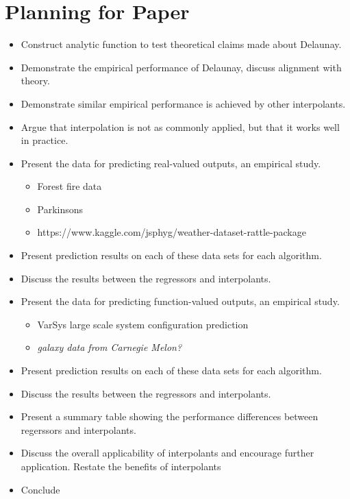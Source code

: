 \documentclass[smallextended]{svjour3}       %
\begin{document}
\section{Planning for Paper}

\begin{itemize}
\item Construct analytic function to test theoretical claims made about Delaunay.
\item Demonstrate the empirical performance of Delaunay, discuss alignment with theory.
\item Demonstrate similar empirical performance is achieved by other interpolants.
\item Argue that interpolation is not as commonly applied, but that it works well in practice.
\item Present the data for predicting real-valued outputs, an empirical study.
  \begin{itemize}
  \item Forest fire data
  \item Parkinsons
  \item https://www.kaggle.com/jsphyg/weather-dataset-rattle-package
  \end{itemize}
\item Present prediction results on each of these data sets for each algorithm.
\item Discuss the results between the regressors and interpolants.
\item Present the data for predicting function-valued outputs, an empirical study.
  \begin{itemize}
  \item VarSys large scale system configuration prediction
  \item \textit{galaxy data from Carnegie Melon?}
  \end{itemize}
\item Present prediction results on each of these data sets for each algorithm.
\item Discuss the results between the regressors and interpolants.
\item Present a summary table showing the performance differences between regerssors and interpolants.
\item Discuss the overall applicability of interpolants and encourage further application. Restate the benefits of interpolants
\item Conclude
\end{itemize}
\end{document}

